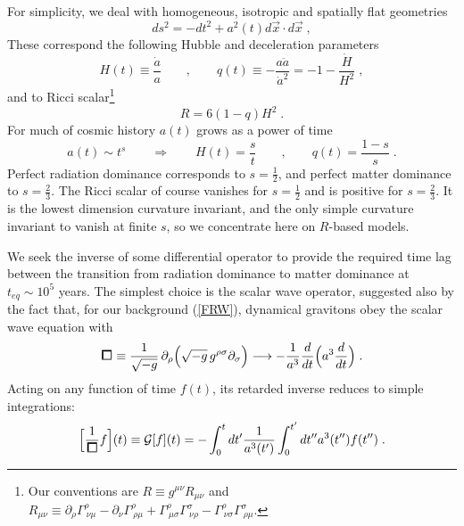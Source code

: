 \documentclass[12pt]{article}
\def\square{\kern1pt\vbox{\hrule height 1.2pt\hbox{\vrule width 1.2pt\hskip 3pt
   \vbox{\vskip 6pt}\hskip 3pt\vrule width 0.6pt}\hrule height 0.6pt}\kern1pt}
\begin{document}
For simplicity, we deal with homogeneous, isotropic and spatially flat
geometries
\begin{equation}
ds^2 = -dt^2 + a^2(t) d\vec{x} \cdot d\vec{x} \; , \label{FRW}
\end{equation}
These correspond the following Hubble and deceleration parameters
\begin{equation}
H(t) \equiv \frac{\dot{a}}{a} \qquad , \qquad q(t) \equiv
-\frac{a \ddot{a}}{\dot{a}^2} = -1 -\frac{\dot{H}}{H^2} \; , \label{Hubdec}
\end{equation}
and to Ricci scalar\footnote{Our conventions are $R \equiv g^{\mu\nu} 
R_{\mu\nu}$ and $R_{\mu\nu} \equiv \partial_{\rho} \Gamma^{\rho}_{~\nu\mu} 
- \partial_{\nu} \Gamma^{\rho}_{~\rho\mu} + \Gamma^{\rho}_{~\mu \sigma} 
\Gamma^{\sigma}_{~\nu\rho} - \Gamma^{\rho}_{~\nu\sigma} \Gamma^{\sigma}_{~\rho
\mu}$.}
\begin{equation}
R = 6 (1 - q) H^2 \; . \label{Ricci}
\end{equation}
For much of cosmic history $a(t)$ grows as a power of time
\begin{equation}
a(t) \sim t^s \qquad \Longrightarrow \qquad H(t) = \frac{s}{t} \qquad ,
\qquad q(t) = \frac{1-s}{s} \; .
\end{equation}
Perfect radiation dominance corresponds to $s = \frac12$, and perfect
matter dominance to $s = \frac23$. The Ricci scalar of course vanishes
for $s=\frac12$ and is positive for $s = \frac23$. It is the lowest
dimension curvature invariant, and the only simple curvature invariant
to vanish at finite $s$, so we concentrate here on $R$-based models.

We seek the inverse of some differential operator to provide the required
time lag between the transition from radiation dominance to matter dominance
at $t_{eq} \sim 10^5$ years. The simplest choice is the scalar wave operator,
suggested also by the fact that, for our background (\ref{FRW}), dynamical
gravitons obey the scalar wave equation \cite{Grish} with
\begin{equation}
\square \equiv \frac1{\sqrt{-g}} \, \partial_{\rho} \Bigl(\sqrt{-g} \,
g^{\rho\sigma} \partial_{\sigma}\Bigr) \longrightarrow -\frac1{a^3}
\frac{d}{dt} \Bigl( a^3 \frac{d}{dt}\Bigr) \; .
\end{equation}
Acting on any function of time $f(t)$, its retarded inverse reduces to
simple integrations:
\begin{equation}
\Bigl[\frac1{\square} f\Bigr](t) \equiv \mathcal{G}[f](t) = - \int_0^t dt' 
\frac1{a^3(t')} \int_0^{t'} dt'' a^3(t'') f(t'') \; . \label{genf}
\end{equation}
\end{document}
